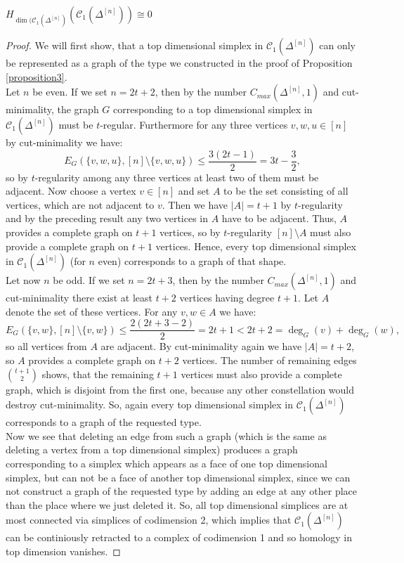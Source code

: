 \begin{thm}\label{theorem3}
\(H_{\dim(\mathcal{C}_1(\Delta^{[n]})}(\mathcal{C}_1(\Delta^{[n]}))\cong 0\)
\begin{proof}
We will first show, that a top dimensional simplex in \(\mathcal{C}_1(\Delta^{[n]})\) can only be represented as a graph of the type we constructed in the proof of Proposition \ref{proposition3}.\\
Let \(n\) be even. If we set \(n=2t+2\), then by the number \(C_{max}(\Delta^{[n]},1)\) and cut-minimality, the graph \(G\) corresponding to a top dimensional simplex in \(\mathcal{C}_1(\Delta^{[n]})\) must be \(t\)-regular. Furthermore for any three vertices \(v,w,u\in [n]\) by cut-minimality we have:
\[
E_G(\{v,w,u\},[n]\setminus\{v,w,u\})\leq\frac{3(2t-1)}{2}=3t-\frac{3}{2},
\]
so by \(t\)-regularity among any three vertices at least two of them must be adjacent. Now choose a vertex \(v\in [n]\) and set \(A\) to be the set consisting of all vertices, which are not adjacent to \(v\). Then we have \(|A|=t+1\) by \(t\)-regularity and by the preceding result any two vertices in \(A\) have to be adjacent. Thus, \(A\) provides a complete graph on \(t+1\) vertices, so by \(t\)-regularity \([n]\setminus A\) must also provide a complete graph on \(t+1\) vertices. Hence, every top dimensional simplex in \(\mathcal{C}_1(\Delta^{[n]})\) (for \(n\) even) corresponds to a graph of that shape.\\
Let now \(n\) be odd. If we set \(n=2t+3\), then by the number \(C_{max}(\Delta^{[n]},1)\) and cut-minimality there exist at least \(t+2\) vertices having degree \(t+1\). Let \(A\) denote the set of these vertices. For any \(v,w\in A\) we have:
\[
E_G(\{v,w\},[n]\setminus\{v,w\})\leq\frac{2(2t+3-2)}{2}=2t+1<2t+2=\deg_G(v)+\deg_G(w),
\]
so all vertices from \(A\) are adjacent. By cut-minimality again we have \(|A|=t+2\), so \(A\) provides a complete graph on \(t+2\) vertices. The number of remaining edges \(\binom{t+1}{2}\) shows, that the remaining \(t+1\) vertices must also provide a complete graph, which is disjoint from the first one, because any other constellation would destroy cut-minimality. So, again every top dimensional simplex in \(\mathcal{C}_1(\Delta^{[n]})\) corresponds to a graph of the requested type.\\
Now we see that deleting an edge from such a graph (which is the same as deleting a vertex from a top dimensional simplex) produces a graph corresponding to a simplex which appears as a face of one top dimensional simplex, but can not be a face of another top dimensional simplex, since we can not construct a graph of the requested type by adding an edge at any other place than the place where we just deleted it. So, all top dimensional simplices are at most connected via simplices of codimension 2, which implies that \(\mathcal{C}_1(\Delta^{[n]})\) can be continiously retracted to a complex of codimension 1 and so homology in top dimension vanishes.
\end{proof}
\end{thm}

